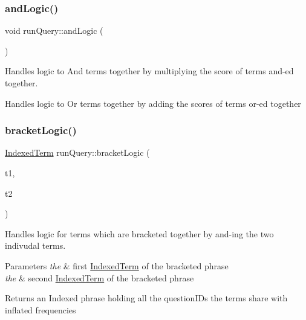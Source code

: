 \subsubsection{\texorpdfstring{and\+Logic()}{andLogic()}}
{\footnotesize\ttfamily void run\+Query\+::and\+Logic (\begin{DoxyParamCaption}{ }\end{DoxyParamCaption})}



Handles logic to And terms together by multiplying the score of terms and-\/ed together. 

Handles logic to Or terms together by adding the scores of terms or-\/ed together\mbox{\label{classrunQuery_ad5641a6335515ddeca95c1db2303c9b8}} 
\subsubsection{\texorpdfstring{bracket\+Logic()}{bracketLogic()}}
{\footnotesize\ttfamily \mbox{\hyperlink{classIndexedTerm}{Indexed\+Term}} run\+Query\+::bracket\+Logic (\begin{DoxyParamCaption}\item[{\mbox{\hyperlink{classIndexedTerm}{Indexed\+Term}}}]{t1,  }\item[{\mbox{\hyperlink{classIndexedTerm}{Indexed\+Term}}}]{t2 }\end{DoxyParamCaption})}



Handles logic for terms which are bracketed together by and-\/ing the two indivudal terms. 


\begin{DoxyParams}{Parameters}
{\em the} & first \mbox{\hyperlink{classIndexedTerm}{Indexed\+Term}} of the bracketed phrase \\
\hline
{\em the} & second \mbox{\hyperlink{classIndexedTerm}{Indexed\+Term}} of the bracketed phrase \\
\hline
\end{DoxyParams}
\begin{DoxyReturn}{Returns}
an Indexed phrase holding all the question\+I\+Ds the terms share with inflated frequencies 
\end{DoxyReturn}
\mbox{\label{classrunQuery_a8bfd9815fef1929543a6b5b200b6a262}} 
